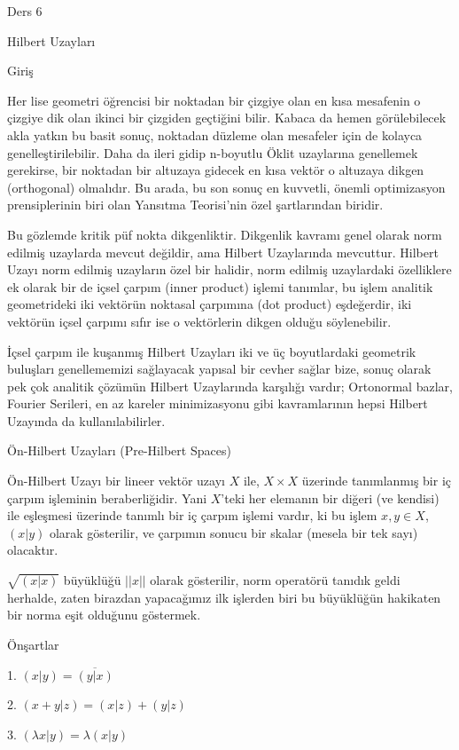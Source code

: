 \documentclass[12pt,fleqn]{article}\usepackage{../../common}
\begin{document}
Ders 6

Hilbert Uzayları 

Giriş 

Her lise geometri öğrencisi bir noktadan bir çizgiye olan en kısa mesafenin
o çizgiye dik olan ikinci bir çizgiden geçtiğini bilir. Kabaca da hemen
görülebilecek akla yatkın bu basit sonuç, noktadan düzleme olan mesafeler
için de kolayca genelleştirilebilir. Daha da ileri gidip n-boyutlu Öklit
uzaylarına genellemek gerekirse, bir noktadan bir altuzaya gidecek en kısa
vektör o altuzaya dikgen (orthogonal) olmalıdır. Bu arada, bu son sonuç en
kuvvetli, önemli optimizasyon prensiplerinin biri olan Yansıtma Teorisi'nin
özel şartlarından biridir.

Bu gözlemde kritik püf nokta dikgenliktir. Dikgenlik kavramı genel olarak
norm edilmiş uzaylarda mevcut değildir, ama Hilbert Uzaylarında
mevcuttur. Hilbert Uzayı norm edilmiş uzayların özel bir halidir, norm
edilmiş uzaylardaki özelliklere ek olarak bir de içsel çarpım (inner
product) işlemi tanımlar, bu işlem analitik geometrideki iki vektörün
noktasal çarpımına (dot product) eşdeğerdir, iki vektörün içsel çarpımı
sıfır ise o vektörlerin dikgen olduğu söylenebilir.

İçsel çarpım ile kuşanmış Hilbert Uzayları iki ve üç boyutlardaki geometrik
buluşları genellememizi sağlayacak yapısal bir cevher sağlar bize, sonuç
olarak pek çok analitik çözümün Hilbert Uzaylarında karşılığı vardır;
Ortonormal bazlar, Fourier Serileri, en az kareler minimizasyonu gibi
kavramlarının hepsi Hilbert Uzayında da kullanılabilirler.

Ön-Hilbert Uzayları (Pre-Hilbert Spaces) 

Ön-Hilbert Uzayı bir lineer vektör uzayı $X$ ile, $X \times X$ üzerinde
tanımlanmış bir iç çarpım işleminin beraberliğidir. Yani $X$'teki her
elemanın bir diğeri (ve kendisi) ile eşleşmesi üzerinde tanımlı bir iç
çarpım işlemi vardır, ki bu işlem $x,y \in X$, $(x|y)$ olarak gösterilir,
ve çarpımın sonucu bir skalar (mesela bir tek sayı) olacaktır. 

$\sqrt{ (x|x)}$ büyüklüğü $||x||$ olarak gösterilir, norm operatörü tanıdık
geldi herhalde, zaten birazdan yapacağımız ilk işlerden biri bu büyüklüğün
hakikaten bir norma eşit olduğunu göstermek. 

Önşartlar 

1. $(x|y) = \overline{(y|x)}$

2. $(x+y|z) = (x|z) + (y|z)$

3. $(\lambda x|y) = \lambda(x|y)$
\end{document}
